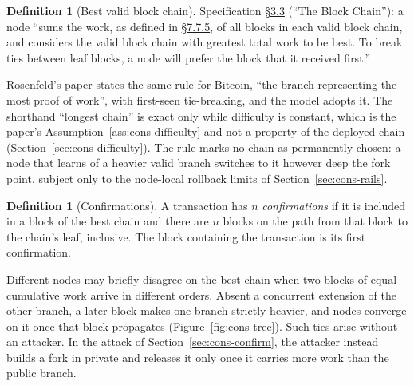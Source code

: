 \documentclass[11pt,a4paper]{article}
\theoremstyle{definition}
\newtheorem{definition}[theorem]{Definition}
\begin{document}
\begin{definition}[Best valid block chain]\label{def:cons-best}
Specification \href{https://zips.z.cash/protocol/protocol.pdf\#blockchain}{\S3.3} (``The Block Chain''): a node ``sums the work, as
defined in \href{https://zips.z.cash/protocol/protocol.pdf\#workdef}{\S7.7.5}, of all blocks in each valid block chain, and
considers the valid block chain with greatest total work to be best. To
break ties between leaf blocks, a node will prefer the block that it
received first.''
\end{definition}

Rosenfeld's paper states the same rule for Bitcoin, ``the branch
representing the most proof of work'', with first-seen tie-breaking, and the
model adopts it. The shorthand ``longest chain'' is exact only while
difficulty is constant, which is the paper's
Assumption~\ref{ass:cons-difficulty} and not a property of the deployed chain
(Section~\ref{sec:cons-difficulty}). The rule marks no chain as permanently
chosen: a node that learns of a heavier valid branch switches to it however
deep the fork point, subject only to the node-local rollback limits of
Section~\ref{sec:cons-rails}.

\begin{definition}[Confirmations]\label{def:cons-conf}
A transaction has $n$ \emph{confirmations} if it is included in a block
of the best chain and there are $n$ blocks on the path from that block
to the chain's leaf, inclusive. The block containing the transaction is
its first confirmation.
\end{definition}

Different nodes may briefly disagree on the best chain when two blocks
of equal cumulative work arrive in different orders. Absent a concurrent
extension of the other branch, a later block makes one branch strictly
heavier, and nodes converge on it once that block propagates
(Figure~\ref{fig:cons-tree}). Such ties arise without an attacker. In the
attack of Section~\ref{sec:cons-confirm}, the attacker instead builds a fork
in private and releases it only once it carries more work than the public
branch.
\end{document}
